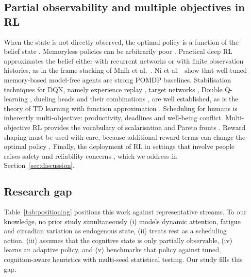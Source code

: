\subsection{Partial observability and multiple objectives in RL}
When the state is not directly observed, the optimal policy is a function of the belief state \cite{astrom1965,smallwood1973,kaelbling1998}. Memoryless policies can be arbitrarily poor \cite{singh1994}. Practical deep RL approximates the belief either with recurrent networks \cite{hausknecht2015,hochreiter1997,igl2018} or with finite observation histories, as in the frame stacking of Mnih et al.~\cite{mnih2015}. Ni et al.~\cite{ni2022} show that well-tuned memory-based model-free agents are strong POMDP baselines. Stabilisation techniques for DQN, namely experience replay \cite{lin1992}, target networks \cite{mnih2015}, Double Q-learning \cite{vanhasselt2016}, dueling heads \cite{wang2016dueling} and their combinations \cite{hessel2018}, are well established, as is the theory of TD learning with function approximation \cite{tsitsiklis1997}. Scheduling for humans is inherently multi-objective: productivity, deadlines and well-being conflict.  Multi-objective RL provides the vocabulary of scalarisation and Pareto fronts \cite{roijers2013,vamplew2011,hayes2022}. Reward shaping must be used with care, because additional reward terms can change the optimal policy \cite{ng1999}. Finally, the deployment of RL in settings that involve people raises safety and reliability concerns \cite{amodei2016,garcia2015,dulacarnold2021}, which we address in Section~\ref{sec:discussion}.

\subsection{Research gap}
Table~\ref{tab:positioning} positions this work against representative streams. To our knowledge, no prior study simultaneously (i) models dynamic attention, fatigue and circadian variation as endogenous state, (ii) treats rest as a scheduling action, (iii) assumes that the cognitive state is only partially observable, (iv) learns an adaptive policy, and (v) benchmarks that policy against tuned, cognition-aware heuristics with multi-seed statistical testing. Our study fills this gap.

